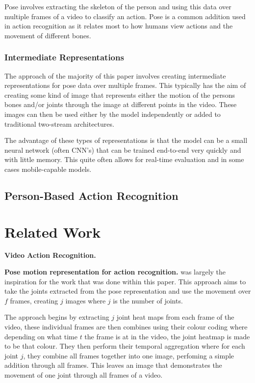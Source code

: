 \documentclass[10pt,twocolumn,letterpaper]{article}
\begin{document}
Pose involves extracting the skeleton of the person and using this data over multiple frames of a video to classify an action. Pose is a common addition used in action recognition as it relates most to how humans view actions and the movement of different bones.

\subsubsection{Intermediate Representations}

The approach of the majority of this paper involves creating intermediate representations for pose data over multiple frames. This typically has the aim of creating some kind of image that represents either the motion of the persons bones and/or joints through the image at different points in the video. These images can then be used either by the model independently or added to traditional two-stream architectures.

The advantage of these types of representations is that the model can be a small neural network (often CNN's) that can be trained end-to-end very quickly and with little memory. This quite often allows for real-time evaluation and in some cases mobile-capable models.

\subsection{Person-Based Action Recognition}

\section{Related Work}
\label{sec:relatedwork}

\textbf{Video Action Recognition.} 

\textbf{Pose motion representation for action recognition.} \cite{potion} was largely the inspiration for the work that was done within this paper. This approach aims to take the joints extracted from the pose representation and use the movement over $f$ frames, creating $j$ images where $j$ is the number of joints.

The approach begins by extracting $j$ joint heat maps from each frame of the video, these individual frames are then combines using their colour coding where depending on what time $t$ the frame is at in the video, the joint heatmap is made to be that colour. They then perform their temporal aggregation where for each joint $j$, they combine all frames together into one image, perfoming a simple addition through all frames. This leaves an image that demonstrates the movement of one joint through all frames of a video.
\end{document}
